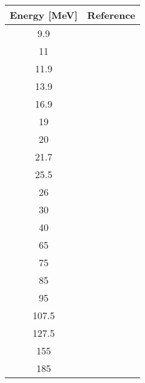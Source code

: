 \begin{tabular}{c c} 
    \hline 
    \bf{Energy [MeV]} & \bf{Reference} \\
    \hline
    \hline 
    9.9 & \cite{Tornow82}\\
    11 & \cite{Rapaport77}\\
    11.9 & \cite{Tornow82}\\
    13.9 & \cite{Honore86}\\
    16.9 & \cite{Honore86}\\
    19 & \cite{Alarcon87}\\
    20 & \cite{Rapaport77}\\
    21.7 & \cite{Alarcon87}\\
    25.5 & \cite{Alarcon87}\\
    26 & \cite{Rapaport77}\\
    30 & \cite{Devito81}\\
    40 & \cite{Devito81}\\
    65 & \cite{Hjort94}\\
    75 & \cite{Osborne04}\\
    85 & \cite{Osborne04}\\
    95 & \cite{Osborne04}\\
    107.5 & \cite{Osborne04}\\
    127.5 & \cite{Osborne04}\\
    155 & \cite{Osborne04}\\
    185 & \cite{Osborne04}\\
    \hline
\end{tabular}
